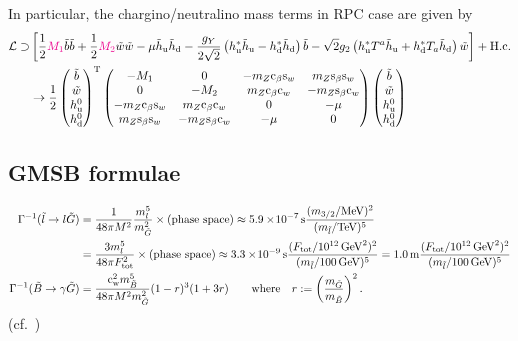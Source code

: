 \documentclass[CheatSheet]{subfiles}
\begin{document}
In particular, the chargino/neutralino mass terms in RPC case are given by
\begin{align}
 \mathcal L\supset
&\left[
  \frac12{{\color{magenta}M_1}}\tilde b\tilde b
+ \frac12{{\color{magenta}M_2}}\tilde w\tilde w
- \mu\tilde h_{\mathrm{u}}\tilde h_{\mathrm{d}}
- \frac{g_Y}{2\sqrt2} \left(h_{\mathrm{u}}^*\tilde h_{\mathrm{u}}-h_{\mathrm{d}}^*\tilde h_{\mathrm{d}}\right)\tilde b
- \sqrt{2}{g_2} \left(h_{\mathrm{u}}^*T^a\tilde h_{\mathrm{u}}+h_{\mathrm{d}}^*T_a\tilde h_{\mathrm{d}}\right)\tilde w
\right]+\text{H.c.}
\\
&\to
\frac{1}{2}
\begin{pmatrix}\tilde b \\ \tilde w \\ h_{\mathrm{u}}^0 \\ h_{\mathrm{d}}^0\end{pmatrix}^{\mathrm{T}}
\begin{pmatrix}
 -M_1 & 0 & -m_Z \mathrm{c}_{\beta} \mathrm{s}_{w} & m_Z \mathrm{s}_{\beta} \mathrm{s}_{w} \\
 0 & -M_ 2 & m_Z \mathrm{c}_{\beta} \mathrm{c}_{w} & -m_Z \mathrm{s}_{\beta} \mathrm{c}_{w} \\
 -m_Z \mathrm{c}_{\beta} \mathrm{s}_{w} & m_Z \mathrm{c}_{\beta} \mathrm{c}_{w} & 0 & -\mu  \\
 m_Z \mathrm{s}_{\beta} \mathrm{s}_{w} & -m_Z \mathrm{s}_{\beta} \mathrm{c}_{w} & -\mu  & 0
\end{pmatrix}
\begin{pmatrix}\tilde b \\ \tilde w \\ h_{\mathrm{u}}^0 \\ h_{\mathrm{d}}^0\end{pmatrix}
\end{align}

\clearpage

\subsection{GMSB formulae}
\begin{align}
 \Gamma^{-1}(\tilde l\to l\tilde G)
&=
\frac{1}{48\pi M^2}\frac{m_l^5}{m_{\tilde G}^2}\times\text{(phase space)}
\approx5.9\EE-7\unit{s} \frac{(m_{3/2}/\text{MeV})^2}{(m_{\tilde l}/\text{TeV})^5}
\\&=
\frac{3m_l^5}{48\pi F\w{tot}^2}\times\text{(phase space)}
\approx3.3\EE-9\unit{s} \frac{(F\w{tot}/10^{12}\GeV^2)^2}{(m_{\tilde l}/100\GeV)^5}
=1.0\unit{m} \frac{(F\w{tot}/10^{12}\GeV^2)^2}{(m_{\tilde l}/100\GeV)^5}
\\
 \Gamma^{-1}(\tilde B\to \gamma\tilde G)
&=
\frac{\cw^2 m_{\tilde B}^5}{48\pi M^2m_{\tilde G}^2}(1-r)^3(1+3r)
\qquad\text{where}\quad r:=\left(\frac{m_{\tilde G}}{m_{\tilde B}}\right)^2.
\end{align}
(cf.~\cite{Covi:2009bk})
\end{document}
